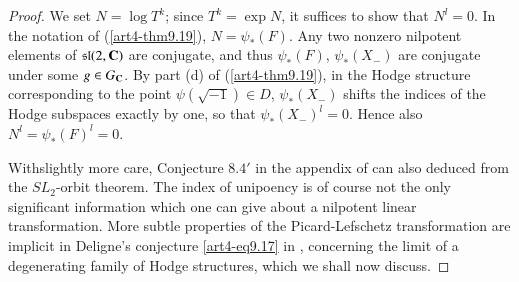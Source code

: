 \begin{proof}
We set $N = \log T^k$; since $T^k = \exp N$, it suffices to show that $N^l = 0$. In the notation of (\ref{art4-thm9.19}), $N = \psi_\ast (F)$. Any two nonzero nilpotent elements of $\mathfrak{s}\mathfrak{l}(2, \mathbf{C})$ are conjugate, and thus $\psi_\ast (F)$, $\psi_\ast (X_-)$ are conjugate under some $g \in G_{\mathbf{C}}$. By part (d) of (\ref{art4-thm9.19}), in the Hodge structure corresponding to the point $\psi (\sqrt{-1}) \in D$, $\psi_\ast (X_-)$ shifts the indices of the Hodge subspaces exactly by one, so that $\psi_\ast (X_-)^l =0$. Hence also $N^l = \psi_\ast (F)^l = 0$.

With\pageoriginale slightly more care, Conjecture $8.4'$ in the appendix of \cite{art4-key21} can also deduced from the $SL_2$-orbit theorem. The index of unipoency is of course not the only significant information which one can give about a nilpotent linear transformation. More subtle properties of the Picard-Lefschetz transformation are implicit in Deligne's conjecture \eqref{art4-eq9.17} in \cite{art4-key21}, concerning the limit of a degenerating family of Hodge structures, which we shall now discuss.


\end{proof}
